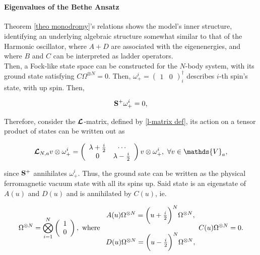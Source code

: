 \documentclass{homework}
\begin{document}
\blanky \\

\paragraph{\textbf{Eigenvalues of the Bethe Ansatz}}

Theorem \ref{theo monodromy}'s relations shows the model's inner structure, identifying an underlying algebraic structure somewhat similar to that of the Harmonic oscillator, where $A+D$ are associated with the eigenenergies, and where $B$ and $C$ can be interpreted as ladder operators. \\

Then, a Fock-like state space can be constructed for the $N$-body system, with its ground state satisfying $C \Omega^{\otimes N} = 0$. Then, $\omega_+^{i} = \left( \begin{array}{cc}
    1 & 0 
\end{array}\right)_{i}^{\dagger}$ describes $i$-th spin's state, with up spin. Then, 

$$
{\bf S}^{+} \omega_+^{i} = 0,
$$

Therefore, consider the $\bm{\mathcal{L}}$-matrix, defined by \eqref{l-matrix def}, its action on a tensor product of states can be written out as 

\begin{equation}
    \bl_{N, a} v \otimes \omega_+^{i} =  \left(\begin{array}{cc}
        \lambda + \frac{i}{2} & \cdots \\
        0 &  \lambda - \frac{i}{2}
    \end{array}\right) v \otimes \omega_+^{i}, \blanky \forall v \in \mathds{V}_a,
\end{equation}

since ${\bf S}^{+}$ annihilates $\omega_+^i$. Thus, the ground sate can be written as the physical ferromagnetic vacuum state with all its spins up. Said state is an eigenstate of $A(u)$ and $D(u)$ and is annihilated by $C(u)$, ie. 

\begin{align}
    \Omega^{\otimes N} = \bigotimes_{i=1}^{N} \left( \begin{array}{c} 
         1 \\
         0 
    \end{array} \right), \textnormal{ where } \begin{array}{c}
    A(u) \Omega^{\otimes N} = \bigg(u + \frac{i}{2}\bigg)^{N} \Omega^{\otimes N}, \\
    \\
    D(u) \Omega^{\otimes N} = \bigg(u - \frac{i}{2}\bigg)^{N} \Omega^{\otimes N}, \\
    \end{array}
    C(u) \Omega^{\otimes N} = 0. 
\end{align}
\end{document}
